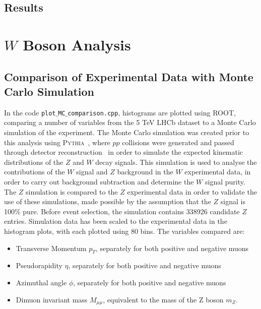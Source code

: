 \documentclass[a4paper,12pt]{article}
\begin{document}
\subsection{Results}







\section{$W$ Boson Analysis} \label{sec: W analysis}
\subsection{Comparison of Experimental Data with Monte Carlo Simulation} \label{sec: Z MC comparison}

In the code \texttt{plot$\_$MC$\_$comparison.cpp}, histograms are plotted using ROOT, comparing a number of variables from the 5 TeV LHCb dataset to a Monte Carlo simulation of the experiment. The Monte Carlo simulation was created prior to this analysis using \textsc{Pythia}~\cite{Pythia_6.4,Pythia_8.1}, where $pp$ collisions were generated and passed through detector reconstruction~\cite{LHCb_reconstruction} in order to simulate the expected kinematic distributions of the $Z$ and $W$ decay signals.
This simulation is used to analyse the contributions of the $W$ signal and $Z$ background in the $W$ experimental data, in order to carry out background subtraction and determine the $W$ signal purity.
The $Z$ simulation is compared to the $Z$ experimental data in order to validate the use of these simulations, made possible by the assumption that the $Z$ signal is 100$\%$ pure.
Before event selection, the simulation contains 338926 candidate $Z$ entries.
Simulation data has been scaled to the experimental data in the histogram plots, with each plotted using 80 bins.
The variables compared are:
\begin{itemize}
  \item Transverse Momentum $p_T$, separately for both positive and negative muons
  \item Pseudorapidity $\eta$, separately for both positive and negative muons
  \item Azimuthal angle $\phi$, separately for both positive and negative muons
  \item Dimuon invariant mass $M_{\mu\mu}$, equivalent to the mass of the Z boson $m_Z$.
\end{itemize}
\end{document}
